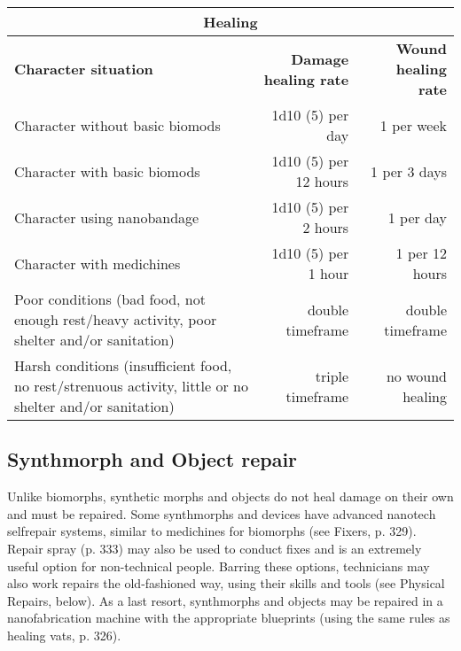 \begin{table} \begin{tabularx}{\textwidth}{|X|r|r|} \hline

\multicolumn{3}{|c|}{\textbf{Healing}} \\ \hline

\textbf{Character situation}	&\textbf{Damage healing rate}	&\textbf{Wound healing rate} \\ \hline

Character without basic biomods	&1d10 (5) per day &1 per week	\\ \hline

Character with basic biomods	&1d10 (5) per 12 hours	&1 per 3 days	\\ \hline

Character using nanobandage	&1d10 (5) per 2 hours	&1 per day	\\ \hline

Character with medichines	&1d10 (5) per 1 hour	&1 per 12 hours	\\ \hline

Poor conditions (bad food, not enough rest/heavy activity, poor shelter and/or sanitation) &double timeframe &double timeframe \\ \hline

Harsh conditions (insufficient food, no rest/strenuous activity, little or no shelter and/or sanitation) &triple timeframe &no wound healing \\ \hline

\end{tabularx} \label{tab:healing} \end{table} 



\subsection{Synthmorph and Object repair} 

Unlike biomorphs, synthetic morphs and objects do not heal damage on their own and must be repaired. Some synthmorphs and devices have advanced nanotech selfrepair systems, similar to medichines for biomorphs (see Fixers, p. 329). Repair spray (p. 333) may also be used to conduct fixes and is an extremely useful option for non-technical people. Barring these options, technicians may also work repairs the old-fashioned way, using their skills and tools (see Physical Repairs, below). As a last resort, synthmorphs and objects may be repaired in a nanofabrication machine with the appropriate blueprints (using the same rules as healing vats, p. 326). 

